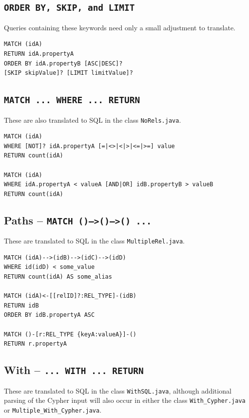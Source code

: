 \documentclass[letterpaper]{ltxdoc}
\begin{document}
\subsection*{\texttt{ORDER BY, SKIP, and LIMIT}}
Queries containing these keywords need only a small adjustment to translate.

\medskip

\begin{lstlisting}[language = Cypher]
MATCH (idA)
RETURN idA.propertyA
ORDER BY idA.propertyB [ASC|DESC]?
[SKIP skipValue]? [LIMIT limitValue]?
\end{lstlisting}

\subsection*{\texttt{MATCH ... WHERE ... RETURN}}
These are also translated to SQL in the class \texttt{NoRels.java}.

\medskip

\begin{lstlisting}[language = Cypher]
MATCH (idA)
WHERE [NOT]? idA.propertyA [=|<>|<|>|<=|>=] value
RETURN count(idA)

MATCH (idA)
WHERE idA.propertyA < valueA [AND|OR] idB.propertyB > valueB
RETURN count(idA)
\end{lstlisting}

\subsection*{Paths -- \texttt{MATCH ()-->()-->() ...}}
These are translated to SQL in the class \texttt{MultipleRel.java}.

\medskip

\begin{lstlisting}[language = Cypher]
MATCH (idA)-->(idB)-->(idC)-->(idD)
WHERE id(idD) < some_value
RETURN count(idA) AS some_alias

MATCH (idA)<-[[relID]?:REL_TYPE]-(idB)
RETURN idB
ORDER BY idB.propertyA ASC

MATCH ()-[r:REL_TYPE {keyA:valueA}]-()
RETURN r.propertyA
\end{lstlisting}

\subsection*{With -- \texttt{... WITH ... RETURN}}
These are translated to SQL in the class \texttt{WithSQL.java}, although additional parsing of the Cypher input will also occur in either the class \texttt{With\_Cypher.java} or \texttt{Multiple\_With\_Cypher.java}.
\end{document}
